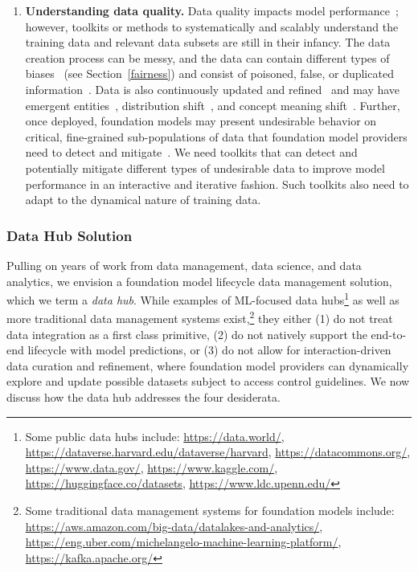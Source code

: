 \begin{enumerate}
    \item \textbf{Understanding data quality.} Data quality impacts model performance~\citep{lee2021deduplicating}; however, toolkits or methods to systematically and scalably understand the training data and relevant data subsets are still in their infancy. The data creation process can be messy, and the data can contain different types of biases~\citep{blodgett_language_2020, bender2021} (see Section~\ref{fairness}) and consist of poisoned, false, or duplicated information~\citep{chang2020adversarial, carlini2021poisoning, BuchananCSET2021, lee2021deduplicating}. Data is also continuously updated and refined~\citep{kiela2021dynabench} and may have emergent entities~\citep{fetahu2015much}, distribution shift~\citep{chen2021mandoline}, and concept meaning shift~\citep{kenter2015ad, lazaridou2021pitfalls}. Further, once deployed, foundation models may present undesirable behavior on critical, fine-grained sub-populations of data that foundation model providers need to detect and mitigate~\citep{goel2021robustnessgym, hohman2018visual, re2019overton, oakden2019hidden}. We need toolkits that can detect and potentially mitigate different types of undesirable data to improve model performance in an interactive and iterative fashion. Such toolkits also need to adapt to the dynamical nature of training data. 
\end{enumerate}

\subsubsection{Data Hub Solution}
\label{sec:data-solutions}
Pulling on years of work from data management, data science, and data analytics, we envision a foundation model lifecycle data management solution, which we term a \textit{data hub}. While examples of ML-focused data hubs\footnote{Some public data hubs include: \url{https://data.world/}, \url{https://dataverse.harvard.edu/dataverse/harvard}, \url{https://datacommons.org/}, \url{https://www.data.gov/}, \url{https://www.kaggle.com/}, \url{https://huggingface.co/datasets}, \url{https://www.ldc.upenn.edu/}} as well as more traditional data management systems exist,\footnote{Some traditional data management systems for foundation models include: \url{https://aws.amazon.com/big-data/datalakes-and-analytics/}, \url{https://eng.uber.com/michelangelo-machine-learning-platform/}, \url{https://kafka.apache.org/}} they either (1) do not treat data integration as a first class primitive, (2) do not natively support the end-to-end lifecycle with model predictions, or (3) do not allow for interaction-driven data curation and refinement, where foundation model providers can dynamically explore and update possible datasets subject to access control guidelines. We now discuss how the data hub addresses the four desiderata.

